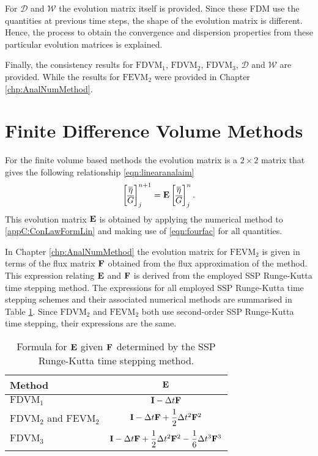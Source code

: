 For $\mathcal{D}$ and $\mathcal{W}$ the evolution matrix itself is provided. Since these FDM use the quantities at previous time steps, the shape of the evolution matrix is different. Hence, the process to obtain the convergence and dispersion properties from these particular evolution matrices is explained. 

Finally, the consistency results for $\text{FDVM}_1$, $\text{FDVM}_2$, $\text{FDVM}_3$, $\mathcal{D}$ and $\mathcal{W}$ are provided. While the results for $\text{FEVM}_2$ were provided in Chapter \ref{chp:AnalNumMethod}. 


\section{Finite Difference Volume Methods}
For the finite volume based methods the evolution matrix is a $2\times2$ matrix that gives the following relationship \eqref{eqn:linearanalaim}
\begin{equation*}
\label{eqn:AppDEFDVM}
\begin{bmatrix}
\overline{\eta} \\\overline{G} 
\end{bmatrix}^{n+1}_j = \mathbf{E} \begin{bmatrix}
\overline{\eta} \\\overline{G}
\end{bmatrix}^{n}_j.
\end{equation*}
This evolution matrix $\mathbf{E}$ is obtained by applying the numerical method to \eqref{appC:ConLawFormLin} and making use of \eqref{eqn:fourfac} for all quantities.

In Chapter \ref{chp:AnalNumMethod} the evolution matrix for $\text{FEVM}_2$ is given in terms of the flux matrix $\mathbf{F}$ obtained from the flux approximation of the method. This expression relating $\mathbf{E}$ and $\mathbf{F}$ is derived from the employed SSP Runge-Kutta time stepping method. The expressions for all employed SSP Runge-Kutta time stepping schemes and their associated numerical methods are summarised in Table \ref{tab:RKstepfactor}. Since $\text{FDVM}_2$ and $\text{FEVM}_2$ both use second-order SSP Runge-Kutta time stepping, their expressions are the same. 

\begin{table}
	\centering
	\begin{tabular}{l  c}
		Method & $\mathbf{E}$  \T\B \\
		\hline 
		$\text{FDVM}_1$& $\mathbf{I} - \Delta t\mathbf{F} $  \T\B \\
		$\text{FDVM}_2$ and $\text{FEVM}_2$ & $ \mathbf{I}  -\Delta t\mathbf{F} + \dfrac{1}{2}\Delta t^2\mathbf{F}^2$  \T\B \\
		$\text{FDVM}_3$& $\mathbf{I} -\Delta t\mathbf{F} + \dfrac{1}{2}\Delta t^2 \mathbf{F}^2 - \dfrac{1}{6}\Delta t^3 \mathbf{F}^3 $  \T\B \\
		\hline
	\end{tabular}
	\caption{Formula for $\mathbf{E}$ given $\mathbf{F}$ determined by the SSP Runge-Kutta time stepping method.}
	\label{tab:RKstepfactor}
\end{table}

